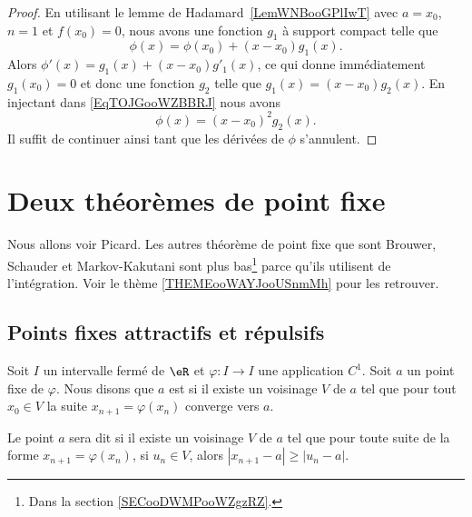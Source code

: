 \begin{proof}
	En utilisant le lemme de Hadamard~\ref{LemWNBooGPlIwT} avec \( a=x_0\), \( n=1\) et \( f(x_0)=0\), nous avons une fonction \( g_1\) à support compact telle que
	\begin{equation}        \label{EqTOJGooWZBBRJ}
		\phi(x)=\phi(x_0)+(x-x_0)g_1(x).
	\end{equation}
	Alors \( \phi'(x)=g_1(x)+(x-x_0)g'_1(x)\), ce qui donne immédiatement \( g_1(x_0)=0\) et donc une fonction \( g_2\) telle que \( g_1(x)=(x-x_0)g_2(x)\). En injectant dans \eqref{EqTOJGooWZBBRJ} nous avons
	\begin{equation}
		\phi(x)=(x-x_0)^2g_2(x).
	\end{equation}
	Il suffit de continuer ainsi tant que les dérivées de \( \phi\) s'annulent.
\end{proof}

\section{Deux théorèmes de point fixe}

Nous allons voir Picard. Les autres théorème de point fixe que sont Brouwer, Schauder et Markov-Kakutani sont plus bas\footnote{Dans la section \ref{SECooDWMPooWZgzRZ}.} parce qu'ils utilisent de l'intégration. Voir le thème \ref{THEMEooWAYJooUSnmMh} pour les retrouver.

\subsection{Points fixes attractifs et répulsifs}

\begin{definition}      \label{DEFooTMZUooMoBDGC}
	Soit \( I\) un intervalle fermé de \( \eR\) et \( \varphi\colon I\to I\) une application \( C^1\). Soit \( a\) un point fixe de \( \varphi\). Nous disons que \( a\) est  si il existe un voisinage \( V\) de \( a\) tel que pour tout \( x_0\in V\) la suite \( x_{n+1}=\varphi(x_n)\) converge vers \( a\).

	Le point \( a\) sera dit  si il existe un voisinage \( V\) de \( a\) tel que pour toute suite de la forme \( x_{n+1}=\varphi(x_n) \), si \( u_n\in V\), alors \( | x_{n+1}-a |\geq | u_n-a |\).
\end{definition}


